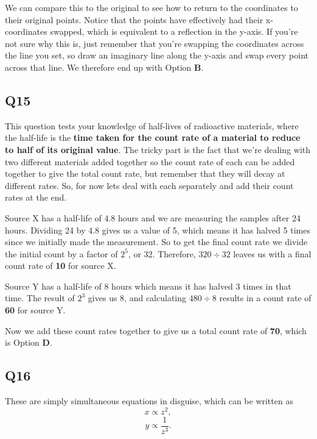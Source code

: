 \documentclass[11pt]{article}
\begin{document}
We can compare this to the original to see how to return to the coordinates to their original points.  Notice that the points have effectively had their x-coordinates swapped, which is equivalent to a reflection in the y-axis.  If you're not sure why this is, just remember that you're swapping the coordinates across the line you set, so draw an imaginary line along the y-axis and swap every point across that line. We therefore end up with Option \textbf{B}.



\subsection*{Q15}
This question tests your knowledge of half-lives of radioactive materials, where the half-life is the \textbf{time taken for the count rate of a material to reduce to half of its original value}.  The tricky part is the fact that we're dealing with two different materials added together so the count rate of each can be added together to give the total count rate, but remember that they will decay at different rates.  So, for now lets deal with each separately and add their count rates at the end.

Source X has a half-life of 4.8 hours and we are measuring the samples after 24 hours.  Dividing 24 by 4.8 gives us a value of 5, which means it has halved 5 times since we initially made the measurement.  So to get the final count rate we divide the initial count by a factor of $2^5$, or 32.  Therefore, $320 \div 32$ leaves us with a final count rate of \textbf{10} for source X.

Source Y has a half-life of 8 hours which means it has halved 3 times in that time.  The result of $2^3$ gives us 8, and calculating $480 \div 8$ results in a count rate of \textbf{60} for source Y.

Now we add these count rates together to give us a total count rate of \textbf{70}, which is Option \textbf{D}.

\subsection*{Q16}
These are simply simultaneous equations in disguise, which can be written as
\begin{equation*}
x \propto z^2,
\end{equation*}
\begin{equation*}
y \propto \frac{1}{z^3}.
\end{equation*}
\end{document}
